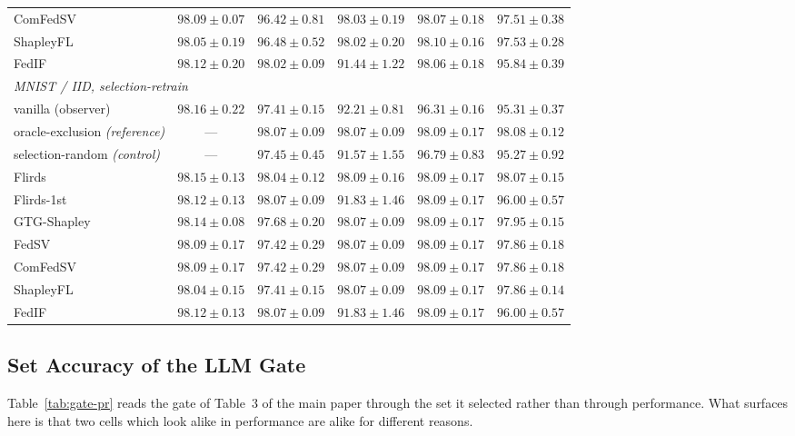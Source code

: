 \documentclass[letterpaper]{article} %
\theoremstyle{plain}
\begin{document}
\begin{table}[t]
\begin{tabular}{lccccc}
ComFedSV & $98.09\pm0.07$ & $96.42\pm0.81$ & $98.03\pm0.19$ & $98.07\pm0.18$ & $97.51\pm0.38$ \\
ShapleyFL & $98.05\pm0.19$ & $96.48\pm0.52$ & $98.02\pm0.20$ & $98.10\pm0.16$ & $97.53\pm0.28$ \\
FedIF & $98.12\pm0.20$ & $98.02\pm0.09$ & $91.44\pm1.22$ & $98.06\pm0.18$ & $95.84\pm0.39$ \\
\hline
\multicolumn{6}{l}{\emph{MNIST / IID, selection-retrain}} \\
vanilla (observer) & $98.16\pm0.22$ & $97.41\pm0.15$ & $92.21\pm0.81$ & $96.31\pm0.16$ & $95.31\pm0.37$ \\
oracle-exclusion \emph{(reference)} & --- & $98.07\pm0.09$ & $98.07\pm0.09$ & $98.09\pm0.17$ & $98.08\pm0.12$ \\
selection-random \emph{(control)} & --- & $97.45\pm0.45$ & $91.57\pm1.55$ & $96.79\pm0.83$ & $95.27\pm0.92$ \\
Flirds & $98.15\pm0.13$ & $98.04\pm0.12$ & $98.09\pm0.16$ & $98.09\pm0.17$ & $98.07\pm0.15$ \\
Flirds-1st & $98.12\pm0.13$ & $98.07\pm0.09$ & $91.83\pm1.46$ & $98.09\pm0.17$ & $96.00\pm0.57$ \\
GTG-Shapley & $98.14\pm0.08$ & $97.68\pm0.20$ & $98.07\pm0.09$ & $98.09\pm0.17$ & $97.95\pm0.15$ \\
FedSV & $98.09\pm0.17$ & $97.42\pm0.29$ & $98.07\pm0.09$ & $98.09\pm0.17$ & $97.86\pm0.18$ \\
ComFedSV & $98.09\pm0.17$ & $97.42\pm0.29$ & $98.07\pm0.09$ & $98.09\pm0.17$ & $97.86\pm0.18$ \\
ShapleyFL & $98.04\pm0.15$ & $97.41\pm0.15$ & $98.07\pm0.09$ & $98.09\pm0.17$ & $97.86\pm0.14$ \\
FedIF & $98.12\pm0.13$ & $98.07\pm0.09$ & $91.83\pm1.46$ & $98.09\pm0.17$ & $96.00\pm0.57$ \\
\hline
\end{tabular}
\end{table}

\subsection{Set Accuracy of the LLM Gate}
\label{app:gate-sets}

Table~\ref{tab:gate-pr} reads the gate of Table~3 of the main paper through
the set it selected rather than through performance. What surfaces here is
that two cells which look alike in performance are alike for different
reasons.
\end{document}
